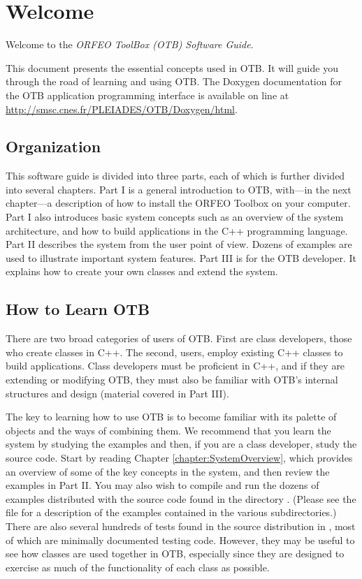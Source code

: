 \chapter{Welcome}
\label{chapter:Welcome}

Welcome to the \emph{ORFEO ToolBox (OTB) Software Guide}.

This document presents the essential concepts used in OTB. It will
guide you through the road of learning and using OTB. The Doxygen
documentation for the OTB application programming interface is
available on line at \url{http://smsc.cnes.fr/PLEIADES/OTB/Doxygen/html}.

\section{Organization}
\label{sec:Organization}

This software guide is divided into three parts, each of which is further
divided into several chapters. Part I is a general introduction to OTB,
with---in the next chapter---a description of how to install the ORFEO
Toolbox on your computer. Part I also
introduces basic system concepts such as an overview of the system
architecture, and how to build applications in the C++ programming
language. Part II describes the system from the user point of view. Dozens
of examples are used to illustrate important system features. Part III is for
the OTB developer. It explains how to create your own classes and extend
the system.%

\section{How to Learn OTB}
\label{sec:HowToLearnOTB}

There are two broad categories of users of OTB. First are class
developers, those who create classes in C++. The second, users, employ
existing C++ classes to build applications. Class developers must be
proficient in C++, and if they are extending or modifying OTB, they
must also be familiar with OTB's internal structures and design
(material covered in Part III). 

The key to learning how to use OTB is to become familiar with its
palette of objects and the ways of combining them. We recommend that you learn the system by studying the
examples and then, if you are a class developer, study the source
code. Start by reading Chapter \ref{chapter:SystemOverview}, which provides an overview of some
of the key concepts in the system, and then review the examples in
Part II. You may also wish to compile and run the dozens of examples
distributed with the source code found in the directory
. (Please see the file
 for a description of the examples
contained in the various subdirectories.) There are also several
hundreds of tests found in the source distribution in
, most of which are minimally documented
testing code. However, they may be useful to see how classes are used
together in OTB, especially since they are designed to exercise as
much of the functionality of each class as possible.

